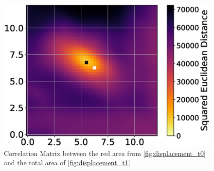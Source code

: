 \documentclass[11pt,twoside,a4paper,fleqn,x11names]{report}
\numberwithin{equation}{chapter}
\numberwithin{figure}{chapter}
\numberwithin{table}{chapter}
\begin{document}
\begin{figure}[ht]
	\includegraphics[width=\textwidth,trim={5mm 0 5mm 0},clip]{Correlation_Matrix.eps}
	\caption{Correlation Matrix between the red area from \ref{fig:displacement_t0} and the total area of \ref{fig:displacement_t1}}
	\label{fig:corr_matrix}
\end{figure}
\end{document}
